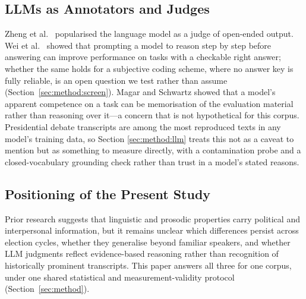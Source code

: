 \documentclass[journal]{IEEEtran}
\begin{document}
\subsection{LLMs as Annotators and Judges}
\label{sec:related:llm}

Zheng et al.\ \cite{zheng2023judging} popularised the language model as a
judge of open-ended output. Wei et al.\ \cite{wei2022chain} showed that
prompting a model to reason step by step before answering can improve
performance on tasks with a checkable right answer; whether the same holds
for a subjective coding scheme, where no answer key is fully reliable, is an
open question we test rather than assume
(Section~\ref{sec:method:screen}). Magar and Schwartz \cite{magar2022data}
showed that a model's apparent competence on a task can be memorisation of
the evaluation material rather than reasoning over it---a concern that is not
hypothetical for this corpus. Presidential debate transcripts are among the
most reproduced texts in any model's training data, so Section
\ref{sec:method:llm} treats this not as a caveat to mention but as something
to measure directly, with a contamination probe and a closed-vocabulary
grounding check rather than trust in a model's stated reasons.

\subsection{Positioning of the Present Study}
\label{sec:related:position}

Prior research suggests that linguistic and prosodic properties carry
political and interpersonal information, but it remains unclear which
differences persist across election cycles, whether they generalise beyond
familiar speakers, and whether LLM judgments reflect evidence-based reasoning
rather than recognition of historically prominent transcripts. This paper
answers all three for one corpus, under one shared statistical and
measurement-validity protocol (Section~\ref{sec:method}).
\end{document}
